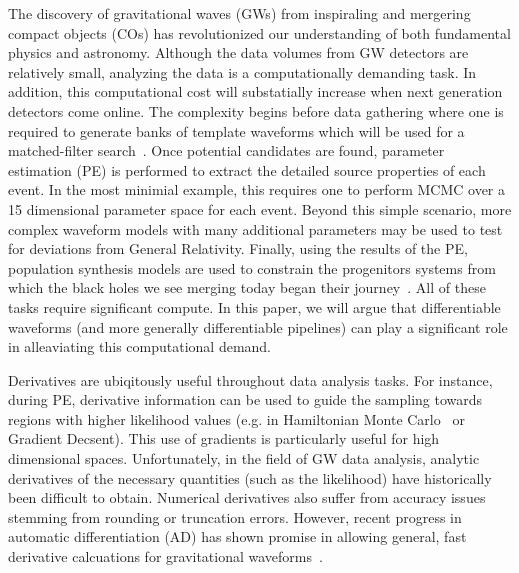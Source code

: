 \documentclass[twocolumn]{aastex631}
\begin{document}
The discovery of gravitational waves (GWs) from inspiraling and mergering compact objects (COs) has revolutionized our understanding of both fundamental physics and astronomy.
Although the data volumes from GW detectors are relatively small, analyzing the data is a computationally demanding task.
In addition, this computational cost will substatially increase when next generation detectors come online.
The complexity begins before data gathering where one is required to generate banks of template waveforms which will be used for a matched-filter search~\citep{Owen:1998dk, Owen:1995tm}. 
Once potential candidates are found, parameter estimation (PE) is performed to extract the detailed source properties of each event.
In the most minimial example, this requires one to perform MCMC over a 15 dimensional parameter space for each event.
Beyond this simple scenario, more complex waveform models with many additional parameters may be used to test for deviations from General Relativity.
Finally, using the results of the PE, population synthesis models are used to constrain the progenitors systems from which the black holes we see merging today began their journey~\citep{Wong:2022flg}.
All of these tasks require significant compute.
In this paper, we will argue that differentiable waveforms (and more generally differentiable pipelines) can play a significant role in alleaviating this computational demand.

Derivatives are ubiqitously useful throughout data analysis tasks.
For instance, during PE, derivative information can be used to guide the sampling towards regions with higher likelihood values (e.g. in Hamiltonian Monte Carlo~\citep{2017arXiv170102434B} or Gradient Decsent).
This use of gradients is particularly useful for high dimensional spaces.
Unfortunately, in the field of GW data analysis, analytic derivatives of the necessary quantities (such as the likelihood) have historically been difficult to obtain.
Numerical derivatives also suffer from accuracy issues stemming from rounding or truncation errors.
However, recent progress in automatic differentiation (AD) has shown promise in allowing general, fast derivative calcuations for gravitational waveforms~\citep{Coogan:2022qxs}.
\end{document}
